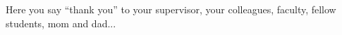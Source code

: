 \begin{thesisacknowledgments}	%

Here you say ``thank you'' to your supervisor, your colleagues, faculty, fellow students, mom and dad...

\end{thesisacknowledgments}